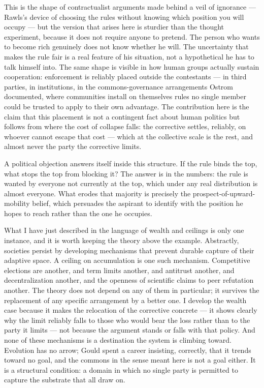 \documentclass[11pt, a4paper]{report}
\begin{document}
This is the shape of contractualist arguments made behind a veil of ignorance --- Rawls's device of choosing the rules without knowing which position you will occupy --- but the version that arises here is sturdier than the thought experiment, because it does not require anyone to pretend. The person who wants to become rich genuinely does not know whether he will. The uncertainty that makes the rule fair is a real feature of his situation, not a hypothetical he has to talk himself into. The same shape is visible in how human groups actually sustain cooperation: enforcement is reliably placed outside the contestants --- in third parties, in institutions, in the commons-governance arrangements Ostrom documented, where communities install on themselves rules no single member could be trusted to apply to their own advantage. The contribution here is the claim that this placement is not a contingent fact about human politics but follows from where the cost of collapse falls: the corrective settles, reliably, on whoever cannot escape that cost --- which at the collective scale is the rest, and almost never the party the corrective limits.

A political objection answers itself inside this structure. If the rule binds the top, what stops the top from blocking it? The answer is in the numbers: the rule is wanted by everyone not currently at the top, which under any real distribution is almost everyone. What erodes that majority is precisely the prospect-of-upward-mobility belief, which persuades the aspirant to identify with the position he hopes to reach rather than the one he occupies.

What I have just described in the language of wealth and ceilings is only one instance, and it is worth keeping the theory above the example. Abstractly, societies persist by developing mechanisms that prevent durable capture of their adaptive space. A ceiling on accumulation is one such mechanism. Competitive elections are another, and term limits another, and antitrust another, and decentralization another, and the openness of scientific claims to peer refutation another. The theory does not depend on any of them in particular; it survives the replacement of any specific arrangement by a better one. I develop the wealth case because it makes the relocation of the corrective concrete --- it shows clearly why the limit reliably falls to those who would bear the loss rather than to the party it limits --- not because the argument stands or falls with that policy. And none of these mechanisms is a destination the system is climbing toward. Evolution has no arrow; Gould spent a career insisting, correctly, that it trends toward no goal, and the commons in the sense meant here is not a goal either. It is a structural condition: a domain in which no single party is permitted to capture the substrate that all draw on.
\end{document}

